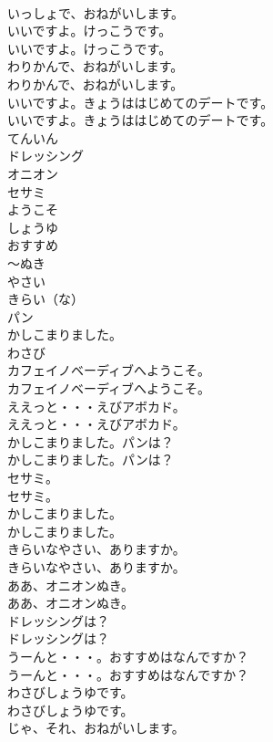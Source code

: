 \documentclass[8pt]{extreport}
\begin{document}
\begin{CJK}{UTF8}{min}
\\	いっしょで、おねがいします。 
\\	いいですよ。けっこうです。	
\\	いいですよ。けっこうです。 
\\	わりかんで、おねがいします。	
\\	わりかんで、おねがいします。 
\\	いいですよ。きょうははじめてのデートです。	
\\	いいですよ。きょうははじめてのデートです。 
\\	てんいん
\\	ドレッシング
\\	オニオン
\\	セサミ
\\	ようこそ
\\	しょうゆ
\\	おすすめ
\\	～ぬき
\\	やさい
\\	きらい（な）
\\	パン
\\	かしこまりました。
\\	わさび
\\	カフェイノベーディブへようこそ。	
\\	カフェイノベーディブへようこそ。 
\\	ええっと・・・えびアボカド。	
\\	ええっと・・・えびアボカド。 
\\	かしこまりました。パンは？	
\\	かしこまりました。パンは？ 
\\	セサミ。	
\\	セサミ。 
\\	かしこまりました。	
\\	かしこまりました。 
\\	きらいなやさい、ありますか。	
\\	きらいなやさい、ありますか。 
\\	ああ、オニオンぬき。	
\\	ああ、オニオンぬき。 
\\	ドレッシングは？	
\\	ドレッシングは？ 
\\	うーんと・・・。おすすめはなんですか？	
\\	うーんと・・・。おすすめはなんですか？ 
\\	わさびしょうゆです。	
\\	わさびしょうゆです。 
\\	じゃ、それ、おねがいします。	

\end{CJK}
\end{document}

